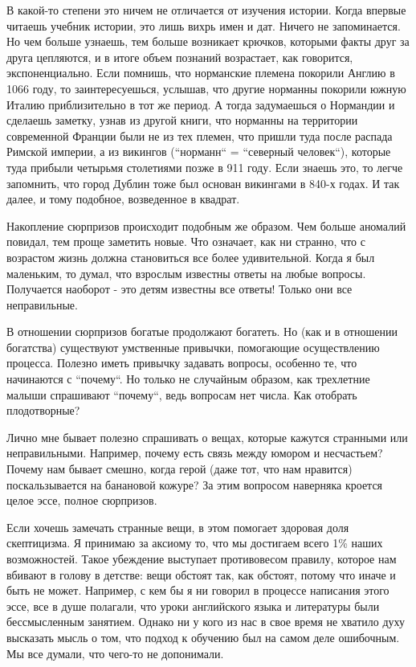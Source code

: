 \documentclass[ebook,12pt,oneside,openany]{memoir}
\begin{document}
В какой-то степени это ничем не отличается от изучения истории. Когда
впервые читаешь учебник истории, это лишь вихрь имен и дат. Ничего не
запоминается. Но чем больше узнаешь, тем больше возникает крючков,
которыми факты друг за друга цепляются, и в итоге объем познаний
возрастает, как говорится, экспоненциально. Если помнишь, что
норманские племена покорили Англию в 1066 году, то заинтересуешься,
услышав, что другие норманны покорили южную Италию приблизительно в
тот же период. А тогда задумаешься о Нормандии и сделаешь заметку,
узнав из другой книги, что норманны на территории современной Франции
были не из тех племен, что пришли туда после распада Римской империи,
а из викингов (``норманн`` = ``северный человек``), которые туда
прибыли четырьмя столетиями позже в 911 году. Если знаешь это, то
легче запомнить, что город Дублин тоже был основан викингами в 840-х
годах. И так далее, и тому подобное, возведенное в квадрат. \newline

Накопление сюрпризов происходит подобным же образом. Чем больше
аномалий повидал, тем проще заметить новые. Что означает, как ни
странно, что с возрастом жизнь должна становиться все более
удивительной. Когда я был маленьким, то думал, что взрослым известны
ответы на любые вопросы. Получается наоборот - это детям известны все
ответы! Только они все неправильные. \newline

В отношении сюрпризов богатые продолжают богатеть. Но (как и в
отношении богатства) существуют умственные привычки, помогающие
осуществлению процесса. Полезно иметь привычку задавать вопросы,
особенно те, что начинаются с ``почему``. Но только не случайным
образом, как трехлетние малыши спрашивают ``почему``, ведь вопросам
нет числа. Как отобрать плодотворные? \newline

Лично мне бывает полезно спрашивать о вещах, которые кажутся странными
или неправильными. Например, почему есть связь между юмором и
несчастьем? Почему нам бывает смешно, когда герой (даже тот, что нам
нравится) поскальзывается на банановой кожуре? За этим вопросом
наверняка кроется целое эссе, полное сюрпризов. \newline

Если хочешь замечать странные вещи, в этом помогает здоровая доля
скептицизма. Я принимаю за аксиому то, что мы достигаем всего 1\%
наших возможностей. Такое убеждение выступает противовесом правилу,
которое нам вбивают в голову в детстве: вещи обстоят так, как обстоят,
потому что иначе и быть не может. Например, с кем бы я ни говорил в
процессе написания этого эссе, все в душе полагали, что уроки
английского языка и литературы были бессмысленным занятием. Однако ни
у кого из нас в свое время не хватило духу высказать мысль о том, что
подход к обучению был на самом деле ошибочным. Мы все думали, что
чего-то не допонимали. \newline
\end{document}
